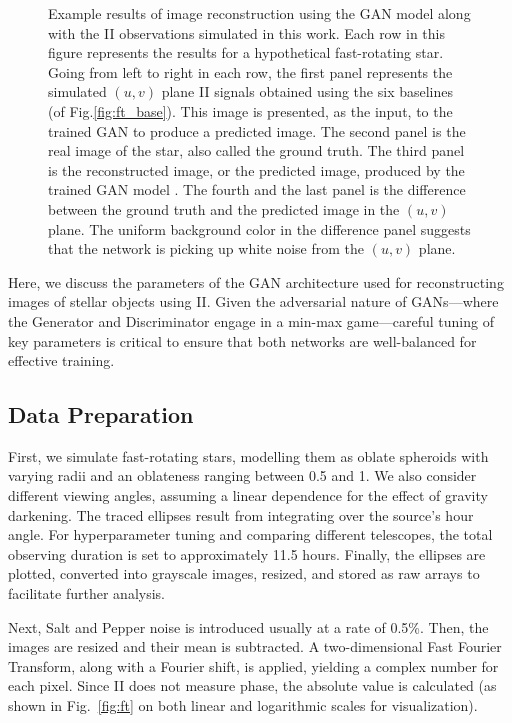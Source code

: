 \begin{figure}
\caption{Example results of image reconstruction using the GAN model along with the II observations simulated in this work. Each row in this figure represents the results for a hypothetical fast-rotating star. Going from left to right in each row, the first panel represents the simulated $(u,v)$ plane II signals obtained using the six baselines (of Fig.\ref{fig:ft_base}). This image is presented, as the input, to the trained GAN to produce a predicted image. The second panel is the real image of the star, also called the ground truth. The third panel is the reconstructed image, or the predicted image, produced by the trained GAN model . The fourth and the last panel is the difference between the ground truth and the predicted image in the $(u,v)$ plane. The uniform background color in the difference panel suggests that the network is picking up white noise from the $(u,v)$ plane. }
	\label{fig:GAN}
\end{figure}
Here, we discuss the parameters of the GAN architecture used for reconstructing images of stellar objects using II. Given the adversarial nature of GANs—where the Generator and Discriminator engage in a min-max game—careful tuning of key parameters is critical to ensure that both networks are well-balanced for effective training.

\subsection{Data Preparation}
First, we simulate fast-rotating stars, modelling them as oblate spheroids with varying radii and an oblateness ranging between 0.5 and 1. We also consider different viewing angles, assuming a linear dependence for the effect of gravity darkening. The traced ellipses result from integrating over the source's hour angle. For hyperparameter tuning and comparing different telescopes, the total observing duration is set to approximately 11.5 hours. Finally, the ellipses are plotted, converted into grayscale images, resized, and stored as raw arrays to facilitate further analysis.

Next, Salt and Pepper noise is introduced usually at a rate of 0.5\%. Then, the images are resized and their mean is subtracted. A two-dimensional Fast Fourier Transform, along with a Fourier shift, is applied, yielding a complex number for each pixel. Since II does not measure phase, the absolute value is calculated (as shown in Fig.~\ref{fig:ft} on both linear and logarithmic scales for visualization). 


